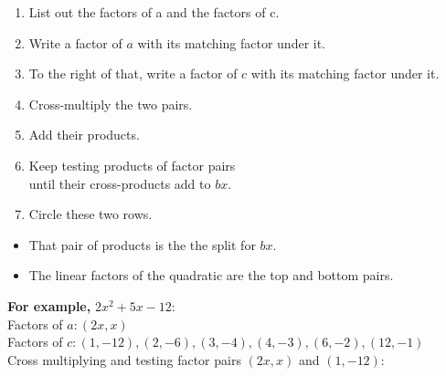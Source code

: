 \documentclass[12pt]{article}
\begin{document}
\begin{enumerate}
\item List out the factors of a and the factors of c.
\item Write a factor of $a$ with its matching factor under it.
\item To the right of that, write a factor of $c$ with its matching factor under it.
\item Cross-multiply the two pairs.
\item Add their products.
\item Keep testing products of factor pairs\\until their cross-products add to $bx$.
\item Circle these two rows.
\end{enumerate}
\begin{itemize}
\item That pair of products is the the split for $bx$.
\item The linear factors of the quadratic are the top and bottom  pairs.
\end{itemize}

\newpage

\textbf{For example,} $2x^2+5x-12$:\\

\noindent
Factors of $a: (2x,x)$\\
Factors of $c: (1,-12), (2,-6), (3,-4), (4,-3), (6,-2), (12,-1)$\\

Cross multiplying and testing factor pairs $(2x,x)$ and $(1,-12):$\\
\end{document}
